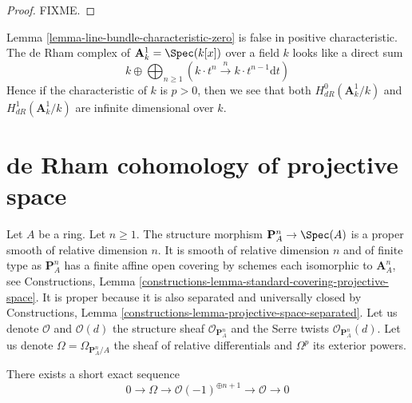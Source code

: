 \begin{proof}
FIXME.
\end{proof}

\begin{example}
\label{example-affine-line}
Lemma \ref{lemma-line-bundle-characteristic-zero} is
false in positive characteristic. The de Rham complex of
$\mathbf{A}^1_k = \Spec(k[x])$ over a field $k$ looks like a direct sum
$$
k \oplus
\bigoplus\nolimits_{n \geq 1}
(k \cdot t^n \xrightarrow{n}
k \cdot t^{n - 1} \text{d}t)
$$
Hence if the characteristic of $k$ is $p > 0$, then
we see that both $H^0_{dR}(\mathbf{A}^1_k/k)$ and
$H^1_{dR}(\mathbf{A}^1_k/k)$
are infinite dimensional over $k$.
\end{example}








\section{de Rham cohomology of projective space}
\label{section-projective-space}

\noindent
Let $A$ be a ring. Let $n \geq 1$. The structure morphism
$\mathbf{P}^n_A \to \Spec(A)$ is a proper smooth of relative
dimension $n$. It is smooth of relative dimension $n$ and of finite type
as $\mathbf{P}^n_A$ has a finite affine open covering by schemes each
isomorphic to $\mathbf{A}^n_A$, see Constructions, Lemma
\ref{constructions-lemma-standard-covering-projective-space}.
It is proper because it is also separated and universally closed
by Constructions, Lemma \ref{constructions-lemma-projective-space-separated}.
Let us denote $\mathcal{O}$ and $\mathcal{O}(d)$ the structure sheaf
$\mathcal{O}_{\mathbf{P}^n_A}$ and the Serre twists
$\mathcal{O}_{\mathbf{P}^n_A}(d)$.
Let us denote $\Omega = \Omega_{\mathbf{P}^n_A/A}$ the sheaf
of relative differentials and $\Omega^p$ its exterior powers.

\begin{lemma}
\label{lemma-euler-sequence}
There exists a short exact sequence
$$
0 \to \Omega \to \mathcal{O}(-1)^{\oplus n + 1} \to \mathcal{O} \to 0
$$
\end{lemma}

